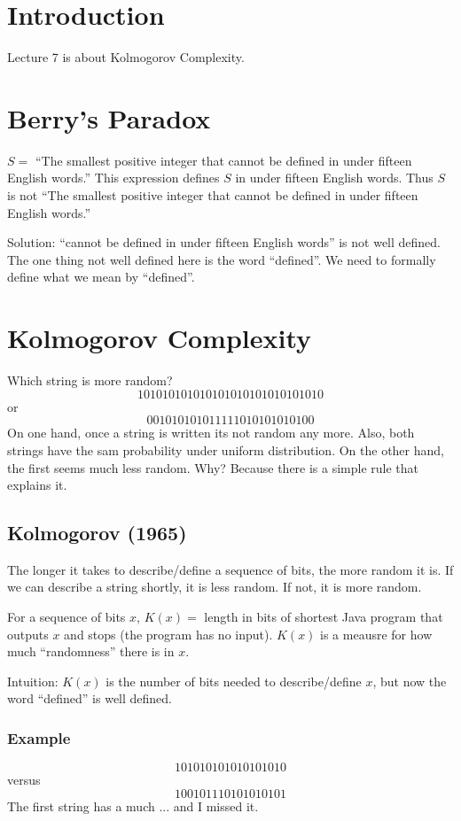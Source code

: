 \documentclass{article}
\begin{document}
\section{Introduction}

Lecture 7 is about Kolmogorov Complexity.

\section{Berry's Paradox}

$S=$ ``The smallest positive integer that cannot be defined in under fifteen English words.'' This expression defines $S$ in under fifteen English words. Thus $S$ is not ``The smallest positive integer that cannot be defined in under fifteen English words.''

Solution: ``cannot be defined in under fifteen English words'' is not well defined. The one thing not well defined here is the word ``defined''. We need to formally define what we mean by ``defined''.

\section{Kolmogorov Complexity}

Which string is more random?
\[
101010101010101010101010101010
\]
or 
\[
001010101011111010101010100
\]
On one hand, once a string is written its not random any more. Also, both strings have the sam probability under uniform distribution. On the other hand, the first seems much less random. Why? Because there is a simple rule that explains it.

\subsection{Kolmogorov (1965)}
The longer it takes to describe/define a sequence of bits, the more random it is. If we can describe a string shortly, it is less random. If not, it is more random.

For a sequence of bits $x$, $K(x)=$ length in bits of shortest Java program that outputs $x$ and stops (the program has no input). $K(x)$ is a meausre for how much ``randomness'' there is in $x$. 

Intuition: $K(x)$ is the number of bits needed to describe/define $x$, but now the word ``defined'' is well defined.

\subsubsection{Example}
\[
101010101010101010
\]
versus
\[
100101110101010101
\]
The first string has a much ... and I missed it.
\end{document}
